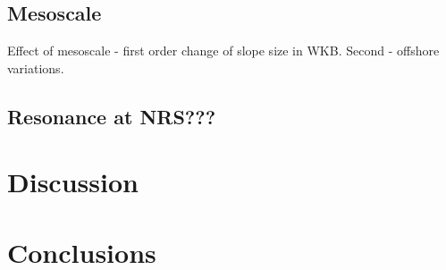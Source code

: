 \subsection{Mesoscale}
Effect of mesoscale - first order change of slope size in WKB. Second - offshore variations.
\begin{figure}
\end{figure}

\subsection{Resonance at NRS???}

\section{Discussion}
\section{Conclusions}





